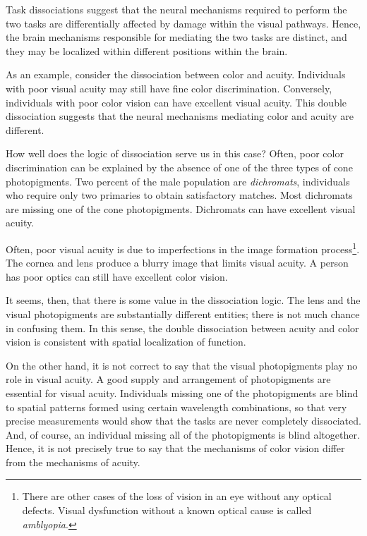Task dissociations suggest that the neural mechanisms required to
perform the two tasks are differentially affected by damage within the
visual pathways.  Hence, the brain mechanisms responsible for
mediating the two tasks are distinct, and they may be localized within
different positions within the brain.

As an example, consider the dissociation between color and acuity.
Individuals with poor visual acuity may still have fine color
discrimination.  Conversely, individuals with poor color vision can
have excellent visual acuity.  This double dissociation suggests that
the neural mechanisms mediating color and acuity are different.

How well does the logic of dissociation serve us in this case?  Often,
poor color discrimination can be explained by the absence of one of
the three types of cone photopigments.  Two percent of the male
population are {\em dichromats}, individuals who require only two
primaries to obtain satisfactory matches.  Most dichromats are missing
one of the cone photopigments.  Dichromats can have excellent visual
acuity.

Often, poor visual acuity is due to imperfections in the image
formation process\footnote{ There are other cases of the loss of
vision in an eye without any optical defects.  Visual dysfunction
without a known optical cause is called {\em amblyopia}.}.  The cornea
and lens produce a blurry image that limits visual acuity.  A person
has poor optics can still have excellent color vision.

It seems, then, that there is some value in the dissociation logic.
The lens and the visual photopigments are substantially different
entities; there is not much chance in confusing them.  In this sense,
the double dissociation between acuity and color vision is consistent
with spatial localization of function.

On the other hand, it is not correct to say that the visual
photopigments play no role in visual acuity.  A good supply and
arrangement of photopigments are essential for visual acuity.
Individuals missing one of the photopigments are blind to spatial
patterns formed using certain wavelength combinations, so that very
precise measurements would show that the tasks are never completely
dissociated.  And, of course, an individual missing all of the
photopigments is blind altogether.  Hence, it is not precisely true to
say that the mechanisms of color vision differ from the mechanisms of
acuity.

